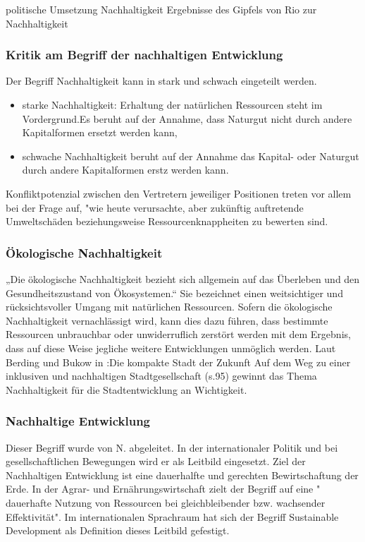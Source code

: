 \documentclass{article}
\begin{document}
politische Umsetzung Nachhaltigkeit
Ergebnisse des Gipfels von Rio zur Nachhaltigkeit

\subsubsection{Kritik am Begriff der nachhaltigen Entwicklung}\cite{NachhaltigeBrockhaus.de}


Der Begriff Nachhaltigkeit kann in stark und schwach eingeteilt werden.\cite{Nachhaltigkeit}


\begin{itemize}
\item starke Nachhaltigkeit: Erhaltung der natürlichen Ressourcen steht im Vordergrund.Es beruht auf der Annahme, dass Naturgut nicht durch andere Kapitalformen ersetzt werden kann,
\item schwache Nachhaltigkeit beruht auf der Annahme das Kapital- oder Naturgut durch andere Kapitalformen erstz werden kann.
\end{itemize}
Konfliktpotenzial zwischen den Vertretern jeweiliger Positionen treten vor allem bei der Frage auf, "wie heute verursachte, aber zukünftig auftretende Umweltschäden beziehungsweise Ressourcenknappheiten zu bewerten sind.\cite{NachhaltigeBrockhaus.de}

\subsubsection{Ökologische Nachhaltigkeit}
„Die ökologische Nachhaltigkeit bezieht sich allgemein auf das Überleben und den Gesundheitszustand von Ökosystemen.“ \cite{DefinitionWirtschaftslexikonc}  Sie bezeichnet einen weitsichtiger und rücksichtsvoller Umgang mit natürlichen Ressourcen. Sofern die ökologische Nachhaltigkeit vernachlässigt wird, kann dies dazu führen, dass bestimmte Ressourcen unbrauchbar oder unwiderruflich zerstört werden mit dem Ergebnis, dass auf diese Weise jegliche weitere Entwicklungen unmöglich werden. Laut Berding und Bukow in :Die kompakte Stadt der Zukunft Auf dem Weg zu einer inklusiven und nachhaltigen Stadtgesellschaft (s.95) \cite{BerdingWolf-DietrichBukowKarinCudakHrsgDieStadtgesellschaft} gewinnt das Thema Nachhaltigkeit für die Stadtentwicklung an Wichtigkeit. 

\subsubsection{Nachhaltige Entwicklung}
 Dieser Begriff wurde von N. abgeleitet. In der internationaler Politik und bei gesellschaftlichen Bewegungen wird er als Leitbild eingesetzt. Ziel der Nachhaltigen Entwicklung ist eine dauerhalfte und gerechten Bewirtschaftung der Erde. \cite{NachhaltigeBrockhaus.de} In der Agrar- und Ernährungswirtschaft zielt der Begriff auf eine " dauerhafte Nutzung von Ressourcen bei gleichbleibender bzw. wachsender Effektivität". \cite{oppenhauser2010nachhaltigkeit} Im internationalen Sprachraum hat sich der Begriff Sustainable Development als Definition dieses Leitbild gefestigt.
 
\end{document}
